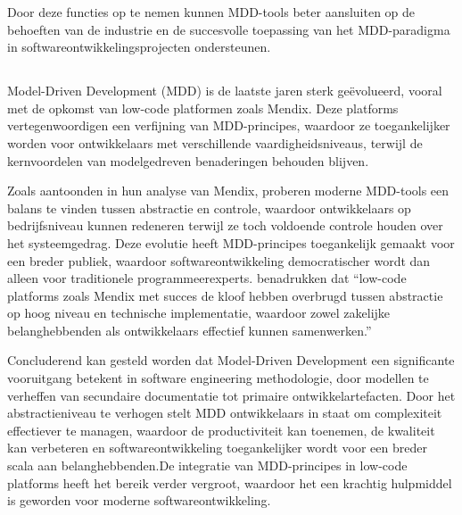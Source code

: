 Door deze functies op te nemen kunnen MDD-tools beter aansluiten op de behoeften van de industrie en de succesvolle toepassing van het MDD-paradigma in softwareontwikkelingsprojecten ondersteunen.

\subsection{}%
Model-Driven Development (MDD) is de laatste jaren sterk geëvolueerd, vooral met de opkomst van low-code platformen zoals Mendix. Deze platforms vertegenwoordigen een verfijning van MDD-principes, waardoor ze toegankelijker worden voor ontwikkelaars met verschillende vaardigheidsniveaus, terwijl de kernvoordelen van modelgedreven benaderingen behouden blijven.

Zoals \textcite{Henkel2010} aantoonden in hun analyse van Mendix, proberen moderne MDD-tools een balans te vinden tussen abstractie en controle, waardoor ontwikkelaars op bedrijfsniveau kunnen redeneren terwijl ze toch voldoende controle houden over het systeemgedrag. Deze evolutie heeft MDD-principes toegankelijk gemaakt voor een breder publiek, waardoor softwareontwikkeling democratischer wordt dan alleen voor traditionele programmeerexperts. \textcite{Henkel2010} benadrukken dat “low-code platforms zoals Mendix met succes de kloof hebben overbrugd tussen abstractie op hoog niveau en technische implementatie, waardoor zowel zakelijke belanghebbenden als ontwikkelaars effectief kunnen samenwerken.”

Concluderend kan gesteld worden dat Model-Driven Development een significante vooruitgang betekent in software engineering methodologie, door modellen te verheffen van secundaire documentatie tot primaire ontwikkelartefacten. Door het abstractieniveau te verhogen stelt MDD ontwikkelaars in staat om complexiteit effectiever te managen, waardoor de productiviteit kan toenemen, de kwaliteit kan verbeteren en softwareontwikkeling toegankelijker wordt voor een breder scala aan belanghebbenden.De integratie van MDD-principes in low-code platforms heeft het bereik verder vergroot, waardoor het een krachtig hulpmiddel is geworden voor moderne softwareontwikkeling.

